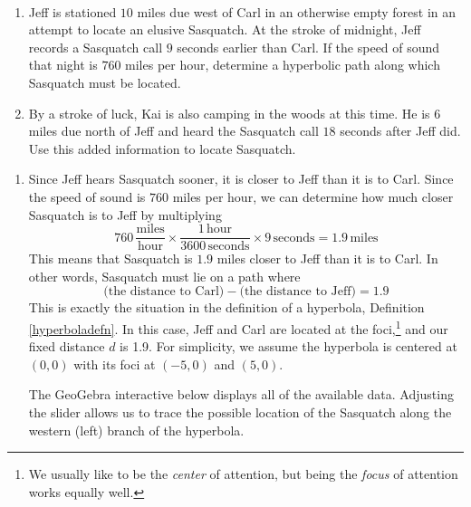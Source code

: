 \documentclass{ximera}
\begin{document}
\begin{example}  \label{FindtheSasquatch} $~$

\begin{enumerate}

\item Jeff is stationed $10$ miles due west of Carl in an otherwise empty forest in an attempt to locate an elusive Sasquatch.  At the stroke of midnight, Jeff records a Sasquatch call $9$ seconds earlier than Carl.  If the speed of sound that night is $760$ miles per hour, determine a hyperbolic path along which Sasquatch must be located.

\item By a stroke of luck, Kai is also camping in the woods at this time.  He is $6$ miles due north of Jeff and heard the Sasquatch call $18$ seconds after Jeff did.  Use this added information to locate Sasquatch.

\end{enumerate}

\begin{explanation} 

\begin{enumerate}

\item Since Jeff hears Sasquatch sooner, it is closer to Jeff than it is to Carl.  Since the speed of sound is $760$ miles per hour, we can determine how much closer Sasquatch is to Jeff by multiplying \[760 \, \frac{\mbox{miles}}{\mbox{hour}} \times \frac{ 1 \, \mbox{hour}}{ 3600 \, \mbox{seconds}} \times 9 \, \mbox{seconds}  = 1.9 \, \mbox{miles}\]  This means that Sasquatch is $1.9$ miles closer to Jeff than it is to Carl.  In other words, Sasquatch must lie on a path where \[\text{(the distance to Carl)} - \text{(the distance to Jeff)} = 1.9\]  This is exactly the situation in the definition of a hyperbola, Definition \ref{hyperboladefn}.  In this case, Jeff and Carl are located at the foci,\footnote{We usually like to be the \textit{center} of attention, but being the \textit{focus} of attention works equally well.} and our fixed distance $d$ is 1.9.  For simplicity, we assume the hyperbola is centered at $(0,0)$ with its foci at $(-5, 0)$ and $(5, 0)$. 

The GeoGebra interactive below displays all of the available data.  Adjusting the slider allows us to trace the possible location of the Sasquatch along the western (left) branch of the hyperbola.

\begin{center}
\end{center}



\end{enumerate}
\end{explanation}
\end{example}
\end{document}
